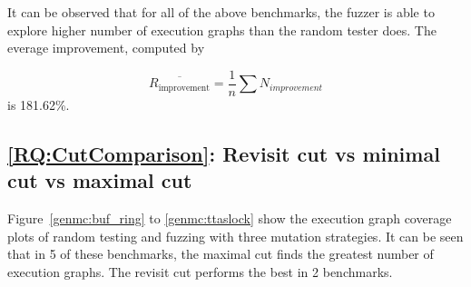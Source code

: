 It can be observed that for all of the above benchmarks, the fuzzer is able to explore higher number of execution graphs than the random tester does. The everage improvement, computed by


\[
	\overline{R_{\text{improvement}}} = \frac{1}{n} \sum N_{improvement}
\]
is 181.62\%.

\subsection{\ref*{RQ:CutComparison}: Revisit cut vs minimal cut vs maximal cut }

Figure~\ref{genmc:buf_ring} to \ref{genmc:ttaslock} show the execution graph coverage plots of random testing and fuzzing with three mutation strategies. It can be seen that in 5 of these benchmarks, the maximal cut finds the greatest number of execution graphs. The revisit cut performs the best in 2 benchmarks.

